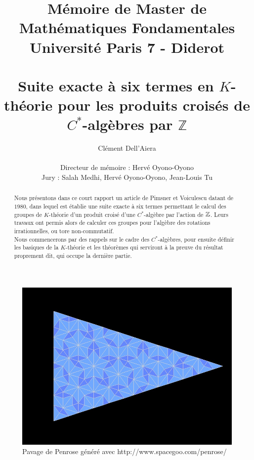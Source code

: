 \documentclass[a4paper]{article}
\title{Mémoire de Master de Mathématiques Fondamentales \\ Université Paris 7 - Diderot \\ ~ \\
\textbf{Suite exacte à six termes en $K$-théorie pour les produits croisés de $C^*$-algèbres par $\mathbb Z$}}
\date{}
\author{ Clément Dell'Aiera \\ \\ Directeur de mémoire : Hervé Oyono-Oyono \\ Jury : Salah Medhi, Hervé Oyono-Oyono, Jean-Louis Tu }
\begin{document}
\maketitle
\begin{figure}[h]\centering
\includegraphics[scale=0.4]{Penrose.png}
\caption{Pavage de Penrose généré avec http://www.spacegoo.com/penrose/}
\label{fig:Penrose}
\end{figure}

\newpage
\begin{abstract}
Nous présentons dans ce court rapport un article de Pimsner et Voiculescu datant de $1980$, dans lequel est établie une suite exacte à six termes permettant le calcul des groupes de $K$-théorie d'un produit croisé d'une $C^*$-algèbre par l'action de $\mathbb Z$. Leurs travaux ont permis alors de calculer ces groupes pour l'algèbre des rotations irrationnelles, ou tore non-commutatif.\\
Nous commencerons par des rappels sur le cadre des $C^*$-algèbres, pour ensuite définir les basiques de la $K$-théorie et les théorèmes qui serviront à la preuve du résultat proprement dit, qui occupe la dernière partie. 
\end{abstract}
\tableofcontents

\newpage







%

%


 
\nocite{*}
\end{document}
